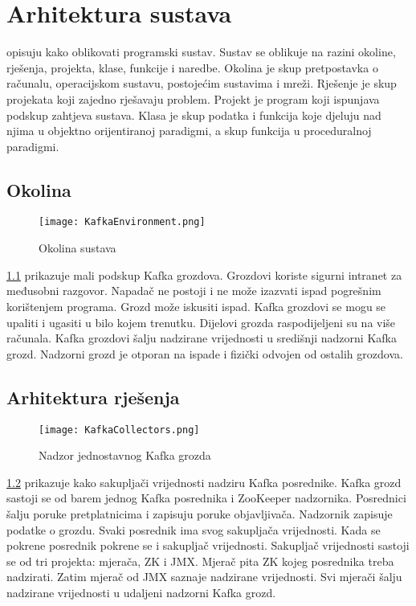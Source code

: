 \documentclass[times, utf8, diplomski, numeric]{fer}
\begin{document}
\chapter{Arhitektura sustava}

\citep{clean-code} \citep{code-complete} opisuju kako oblikovati programski sustav. Sustav se oblikuje na razini okoline, rješenja, projekta, klase, funkcije i naredbe. Okolina je skup pretpostavka o računalu, operacijskom sustavu, postojećim sustavima i mreži. Rješenje je skup projekata koji zajedno rješavaju problem. Projekt je program koji ispunjava podskup zahtjeva sustava. Klasa je skup podatka i funkcija koje djeluju nad njima u objektno orijentiranoj paradigmi, a skup funkcija u proceduralnoj paradigmi.

\section{Okolina}

\begin{figure}[H]
    \centering
    \texttt{[image: KafkaEnvironment.png]}
    \caption{Okolina sustava}
    \label{fig:kafka-environment}
\end{figure}

\ref{fig:kafka-environment} prikazuje mali podskup Kafka grozdova. Grozdovi koriste sigurni intranet za međusobni razgovor. Napadač ne postoji i ne može izazvati ispad pogrešnim korištenjem programa. Grozd može iskusiti ispad. Kafka grozdovi se mogu se upaliti i ugasiti u bilo kojem trenutku. Dijelovi grozda raspodijeljeni su na više računala. Kafka grozdovi šalju nadzirane vrijednosti u središnji nadzorni Kafka grozd. Nadzorni grozd je otporan na ispade i fizički odvojen od ostalih grozdova.

\section{Arhitektura rješenja}

\begin{figure}[H]
    \centering
    \texttt{[image: KafkaCollectors.png]}
    \caption{Nadzor jednostavnog Kafka grozda}
    \label{fig:collectors}
\end{figure}

\ref{fig:collectors} prikazuje kako sakupljači vrijednosti nadziru Kafka posrednike. Kafka grozd sastoji se od barem jednog Kafka posrednika i ZooKeeper nadzornika. Posrednici šalju poruke pretplatnicima i zapisuju poruke objavljivača. Nadzornik zapisuje podatke o grozdu. Svaki posrednik ima svog sakupljača vrijednosti. Kada se pokrene posrednik pokrene se i sakupljač vrijednosti. Sakupljač vrijednosti sastoji se od tri projekta: mjerača, ZK i JMX. Mjerač pita ZK kojeg posrednika treba nadzirati. Zatim mjerač od JMX saznaje nadzirane vrijednosti. Svi mjerači šalju nadzirane vrijednosti u udaljeni nadzorni Kafka grozd.
\end{document}
